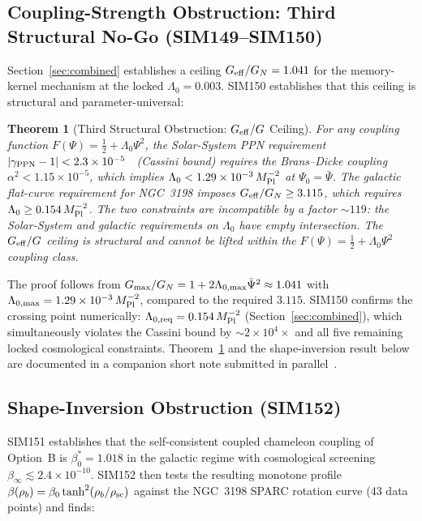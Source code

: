 \documentclass[12pt,a4paper]{article}
\newcommand{\Lz}{\Lambda_0}
\newcommand{\Mpl}{M_{\rm Pl}}
\newcommand{\Geff}{G_{\rm eff}}
\theoremstyle{plain}
\newtheorem{theorem}{Theorem}
\begin{document}
\subsection{Coupling-Strength Obstruction: Third Structural No-Go (SIM149--SIM150)}
\label{sec:theorem3}

Section~\ref{sec:combined} establishes a ceiling $\Geff/G_N = 1.041$ for the
memory-kernel mechanism at the locked $\Lz = 0.003$.  SIM150 establishes that this
ceiling is structural and parameter-universal:

\setcounter{theorem}{2}
\begin{theorem}[Third Structural Obstruction: $\Geff/G$ Ceiling]
\label{thm:geff-ceiling}
For any coupling function $F(\Psi) = \tfrac{1}{2} + \Lz\Psi^2$, the Solar-System
PPN requirement $|\gamma_{\rm PPN} - 1| < 2.3\times10^{-5}$~\cite{Bertotti2003}
(Cassini bound) requires the Brans--Dicke coupling $\alpha^2 < 1.15\times10^{-5}$,
which implies $\Lz < 1.29\times10^{-3}\,\Mpl^{-2}$ at $\Psi_0 = \bar\Psi$.
The galactic flat-curve requirement for NGC~3198 imposes $\Geff/G_N \geq 3.115$,
which requires $\Lz \geq 0.154\,\Mpl^{-2}$.  The two constraints are incompatible
by a factor $\sim119$: the Solar-System and galactic requirements on $\Lz$ have
empty intersection.  The $\Geff/G$ ceiling is structural and cannot be lifted
within the $F(\Psi) = \tfrac{1}{2} + \Lz\Psi^2$ coupling class.
\end{theorem}

The proof follows from $G_{\rm max}/G_N = 1 + 2\Lambda_{0,{\rm max}}\bar\Psi^2
\approx 1.041$ with $\Lambda_{0,{\rm max}} = 1.29\times10^{-3}\,\Mpl^{-2}$,
compared to the required $3.115$.  SIM150 confirms the crossing point numerically:
$\Lambda_{0,{\rm req}} = 0.154\,\Mpl^{-2}$ (Section~\ref{sec:combined}), which
simultaneously violates the Cassini bound by $\sim2\times10^4\times$ and all five
remaining locked cosmological constraints.  Theorem~\ref{thm:geff-ceiling} and the
shape-inversion result below are documented in a companion short note submitted in
parallel~\cite{WilsonCompNote}.

\subsection{Shape-Inversion Obstruction (SIM152)}
\label{sec:shapeinversion}

SIM151 establishes that the self-consistent coupled chameleon coupling of Option~B
is $\beta_0^* = 1.018$ in the galactic regime with cosmological screening
$\beta_\infty \lesssim 2.4\times10^{-10}$.  SIM152 then tests the resulting
monotone profile $\beta(\rho_b) = \beta_0\tanh^2(\rho_b/\rho_{\rm sc})$ against
the NGC~3198 SPARC rotation curve (43 data points) and finds:
\end{document}
